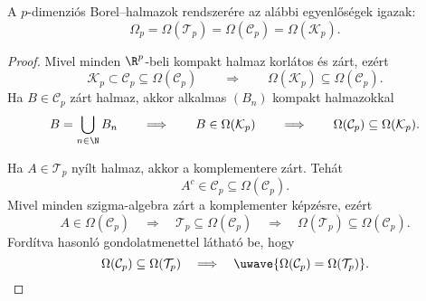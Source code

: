 \documentclass[
]{elteikthesis}[2024/04/26]
\begin{document}
	\begin{statement}{}{}
		A \( p \)-dimenziós Borel--halmazok rendszerére az alábbi egyenlőségek igazak:
		\[
			\Omega_p = 
			\Omega( \mathcal{T}_p ) = 
			\Omega( \mathcal{C}_p ) = 
			\Omega( \mathcal{K}_p ).
		\]
	\end{statement}
	\begin{proof}
		Mivel minden \( \R^p \)-beli kompakt halmaz korlátos és zárt, ezért
		\[
			\mathcal{K}_p \subset \mathcal{C}_p \subseteq \Omega( \mathcal{C}_p )
			\qquad \Longrightarrow \qquad
			\Omega( \mathcal{K}_p ) \subseteq \Omega( \mathcal{C}_p ).
		\]
		Ha \( B \in \mathcal{C}_p \) zárt halmaz, 
		akkor alkalmas \( (B_n) \) kompakt halmazokkal
		\[
			B = \bigcup_{n \in \N} B_n
			\qquad \Longrightarrow \qquad
			B \in \Omega( \mathcal{K}_p )
			\qquad \Longrightarrow \qquad
			\Omega( \mathcal{C}_p ) \subseteq \Omega( \mathcal{K}_p ).
		\]
		
		Ha \( A \in \mathcal{T}_p \) nyílt halmaz, akkor a komplementere zárt.
		Tehát
		\[
			A^c \in \mathcal{C}_p \subseteq \Omega( \mathcal{C}_p ).
		\]
		Mivel minden szigma-algebra zárt a komplementer képzésre, ezért
		\[
			A \in \Omega( \mathcal{C}_p )
			\quad \Longrightarrow \quad
			\mathcal{T}_p \subseteq \Omega( \mathcal{C}_p )
			\quad \Longrightarrow \quad
			\Omega( \mathcal{T}_p ) \subseteq \Omega( \mathcal{C}_p ).
		\]
		Fordítva hasonló gondolatmenettel
		látható be, hogy
		\[
			\Omega( \mathcal{C}_p ) \subseteq \Omega( \mathcal{T}_p )
			\quad \Longrightarrow \quad
			\smash{\uwave{\Omega( \mathcal{C}_p ) = \Omega( \mathcal{T}_p )}}.
		\]
	\end{proof}
	
\end{document}
